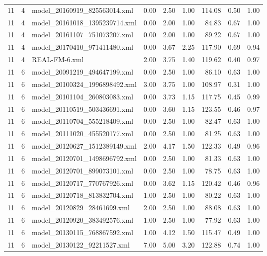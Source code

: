 \begin{table}[ht]
\begin{tabular}{rrlrrrrrr}
   11 &   4 & model\_20160919\_825563014.xml & 0.00 & 2.50 & 1.00 & 114.08 & 0.50 & 1.00 \\ 
   11 &   4 & model\_20161018\_1395239714.xml & 0.00 & 2.00 & 1.00 & 84.83 & 0.67 & 1.00 \\ 
   11 &   4 & model\_20161107\_751073207.xml & 0.00 & 2.00 & 1.00 & 89.22 & 0.67 & 1.00 \\ 
   11 &   4 & model\_20170410\_971411480.xml & 0.00 & 3.67 & 2.25 & 117.90 & 0.69 & 0.94 \\ 
   11 &   4 & REAL-FM-6.xml & 2.00 & 3.75 & 1.40 & 119.62 & 0.40 & 0.97 \\ 
   11 &   6 & model\_20091219\_494647199.xml & 0.00 & 2.50 & 1.00 & 86.10 & 0.63 & 1.00 \\ 
   11 &   6 & model\_20100324\_1996898492.xml & 3.00 & 3.75 & 1.00 & 108.97 & 0.31 & 1.00 \\ 
   11 &   6 & model\_20101104\_260803083.xml & 0.00 & 3.73 & 1.15 & 117.75 & 0.45 & 0.99 \\ 
   11 &   6 & model\_20110519\_503436691.xml & 0.00 & 3.60 & 1.15 & 123.55 & 0.46 & 0.97 \\ 
   11 &   6 & model\_20110704\_555218409.xml & 0.00 & 2.50 & 1.00 & 82.47 & 0.63 & 1.00 \\ 
   11 &   6 & model\_20111020\_455520177.xml & 0.00 & 2.50 & 1.00 & 81.25 & 0.63 & 1.00 \\ 
   11 &   6 & model\_20120627\_1512389149.xml & 2.00 & 4.17 & 1.50 & 122.33 & 0.49 & 0.96 \\ 
   11 &   6 & model\_20120701\_1498696792.xml & 0.00 & 2.50 & 1.00 & 81.33 & 0.63 & 1.00 \\ 
   11 &   6 & model\_20120701\_899073101.xml & 0.00 & 2.50 & 1.00 & 78.75 & 0.63 & 1.00 \\ 
   11 &   6 & model\_20120717\_770767926.xml & 0.00 & 3.62 & 1.15 & 120.42 & 0.46 & 0.96 \\ 
   11 &   6 & model\_20120718\_813832704.xml & 1.00 & 2.50 & 1.00 & 80.22 & 0.63 & 1.00 \\ 
   11 &   6 & model\_20120829\_28461699.xml & 2.00 & 2.50 & 1.00 & 88.08 & 0.63 & 1.00 \\ 
   11 &   6 & model\_20120920\_383492576.xml & 1.00 & 2.50 & 1.00 & 77.92 & 0.63 & 1.00 \\ 
   11 &   6 & model\_20130115\_768867592.xml & 1.00 & 4.12 & 1.50 & 115.47 & 0.49 & 1.00 \\ 
   11 &   6 & model\_20130122\_92211527.xml & 7.00 & 5.00 & 3.20 & 122.88 & 0.74 & 1.00 \\ 

\end{tabular}
\end{table}
